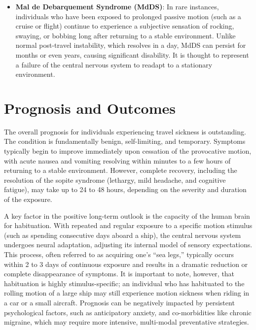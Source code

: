 \begin{itemize}
\begin{itemize}
        \item In elderly patients, anticholinergic medications can precipitate acute urinary retention, exacerbate cognitive decline, or trigger delirium.
    \end{itemize}
    \item \textbf{Mal de Debarquement Syndrome (MdDS)}: In rare instances, individuals who have been exposed to prolonged passive motion (such as a cruise or flight) continue to experience a subjective sensation of rocking, swaying, or bobbing long after returning to a stable environment. Unlike normal post-travel instability, which resolves in a day, MdDS can persist for months or even years, causing significant disability. It is thought to represent a failure of the central nervous system to readapt to a stationary environment.
\end{itemize}

\section*{Prognosis and Outcomes}
The overall prognosis for individuals experiencing travel sickness is outstanding. The condition is fundamentally benign, self-limiting, and temporary. Symptoms typically begin to improve immediately upon cessation of the provocative motion, with acute nausea and vomiting resolving within minutes to a few hours of returning to a stable environment. However, complete recovery, including the resolution of the sopite syndrome (lethargy, mild headache, and cognitive fatigue), may take up to 24 to 48 hours, depending on the severity and duration of the exposure.

A key factor in the positive long-term outlook is the capacity of the human brain for habituation. With repeated and regular exposure to a specific motion stimulus (such as spending consecutive days aboard a ship), the central nervous system undergoes neural adaptation, adjusting its internal model of sensory expectations. This process, often referred to as acquiring one's ``sea legs,'' typically occurs within 2 to 3 days of continuous exposure and results in a dramatic reduction or complete disappearance of symptoms. It is important to note, however, that habituation is highly stimulus-specific; an individual who has habituated to the rolling motion of a large ship may still experience motion sickness when riding in a car or a small aircraft. Prognosis can be negatively impacted by persistent psychological factors, such as anticipatory anxiety, and co-morbidities like chronic migraine, which may require more intensive, multi-modal preventative strategies.

